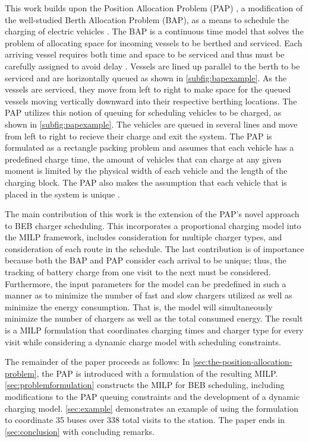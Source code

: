 \documentclass[utf8]{FrontiersinHarvard}
\let\cite\citep                                       %
\newcommand{\A}{35 }                                                            %
\newcommand{\N}{338 }                                                           %
\begin{document}
This work builds upon the Position Allocation Problem (PAP) \cite{qarebagh-2019-optim-sched}, a modification of the
well-studied Berth Allocation Problem (BAP), as a means to schedule the charging of electric vehicles
\cite{buhrkal-2011-model-discr,frojan-2015-contin-berth,imai-2001-dynam-berth}. The BAP is a continuous time model
that solves the problem of allocating space for incoming vessels to be berthed and serviced. Each arriving vessel
requires both time and space to be serviced and thus must be carefully assigned to avoid delay
\cite{imai-2001-dynam-berth}. Vessels are lined up parallel to the berth to be serviced and are horizontally queued as
shown in \autoref{subfig:bapexample}. As the vessels are serviced, they move from left to right to make space for the
queued vessels moving vertically downward into their respective berthing locations. The PAP utilizes this notion of
queuing for scheduling vehicles to be charged, as shown in \autoref{subfig:papexample}. The vehicles are queued in
several lines and move from left to right to recieve their charge and exit the system. The PAP is formulated as a
rectangle packing problem and assumes that each vehicle has a predefined charge time, the amount of vehicles that can
charge at any given moment is limited by the physical width of each vehicle and the length of the charging block. The
PAP also makes the assumption that each vehicle that is placed in the system is unique
\cite{qarebagh-2019-optim-sched}.

The main contribution of this work is the extension of the PAP's novel approach to BEB charger scheduling. This
incorporates a proportional charging model into the MILP framework, includes consideration for multiple charger types,
and consideration of each route in the schedule. The last contribution is of importance because both the BAP and PAP
consider each arrival to be unique; thus, the tracking of battery charge from one visit to the next must be considered.
Furthermore, the input parameters for the model can be predefined in such a manner as to minimize the number of fast and
slow chargers utilized as well as minimize the energy consumption. That is, the model will simultaneously minimize the
number of chargers as well as the total consumed energy. The result is a MILP formulation that coordinates charging
times and charger type for every visit while considering a dynamic charge model with scheduling constraints.

The remainder of the paper proceeds as follows: In \autoref{sec:the-position-allocation-problem}, the PAP is introduced
with a formulation of the resulting MILP. \autoref{sec:problemformulation} constructs the MILP for BEB scheduling,
including modifications to the PAP queuing constraints and the development of a dynamic charging model.
\autoref{sec:example} demonstrates an example of using the formulation to coordinate \A buses over \N total visits to
the station. The paper ends in \autoref{sec:conclusion} with concluding remarks.
\end{document}
